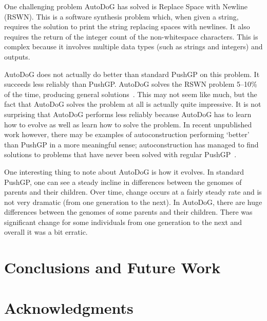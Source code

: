 \documentclass{sig-alternate}
\begin{document}
One challenging problem AutoDoG has solved is Replace Space with Newline (RSWN). This is a software synthesis problem which, when given a string, requires the solution to print the string replacing spaces with newlines. It also requires the return of the integer count of the non-whitespace characters. This is complex because it involves multiple data types (such as strings and integers) and outputs.

AutoDoG does not actually do better than standard PushGP on this problem. It succeeds less reliably than PushGP. AutoDoG solves the RSWN problem 5--10\% of the time, producing general solutions~\cite{spector:2016}. This may not seem like much, but the fact that AutoDoG solves the problem at all is actually quite impressive. It is not surprising that AutoDoG performs less reliably because AutoDoG has to learn how to evolve as well as learn how to solve the problem. In recent unpublished work however, there may be examples of autoconstruction performing `better' than PushGP in a more meaningful sense; autoconstruction has managed to find solutions to problems that have never been solved with regular PushGP~\cite{eva:2017}.


One interesting thing to note about AutoDoG is how it evolves. In standard PushGP, one can see a steady incline in differences between the genomes of parents and their children. Over time, change occurs at a fairly steady rate and is not very dramatic (from one generation to the next). In AutoDoG, there are huge differences between the genomes of some parents and their children. There was significant change for some individuals from one generation to the next and overall it was a bit erratic.
\section{Conclusions and Future Work}
\label{sec:conclusion}

\section{Acknowledgments}
\label{sec:acknowledgments}



  

\end{document}
